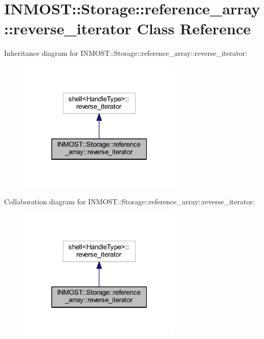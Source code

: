 \hypertarget{classINMOST_1_1Storage_1_1reference__array_1_1reverse__iterator}{\section{I\-N\-M\-O\-S\-T\-:\-:Storage\-:\-:reference\-\_\-array\-:\-:reverse\-\_\-iterator Class Reference}
\label{classINMOST_1_1Storage_1_1reference__array_1_1reverse__iterator}
}


Inheritance diagram for I\-N\-M\-O\-S\-T\-:\-:Storage\-:\-:reference\-\_\-array\-:\-:reverse\-\_\-iterator\-:\nopagebreak
\begin{figure}[H]
\begin{center}
\leavevmode
\includegraphics[width=219pt]{classINMOST_1_1Storage_1_1reference__array_1_1reverse__iterator__inherit__graph}
\end{center}
\end{figure}


Collaboration diagram for I\-N\-M\-O\-S\-T\-:\-:Storage\-:\-:reference\-\_\-array\-:\-:reverse\-\_\-iterator\-:\nopagebreak
\begin{figure}[H]
\begin{center}
\leavevmode
\includegraphics[width=219pt]{classINMOST_1_1Storage_1_1reference__array_1_1reverse__iterator__coll__graph}
\end{center}
\end{figure}
